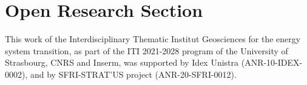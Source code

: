 \documentclass[draft]{agujournal2019}
\begin{document}
\newpage
%
%

\section*{Open Research Section}

\acknowledgments
This work of the Interdisciplinary Thematic Institut Geosciences for the energy system transition, as part of the ITI 2021-2028 program of the University of Strasbourg, CNRS and Inserm, was supported by Idex Unistra (ANR-10-IDEX-0002), and by SFRI-STRAT'US project (ANR-20-SFRI-0012).


\end{document}
